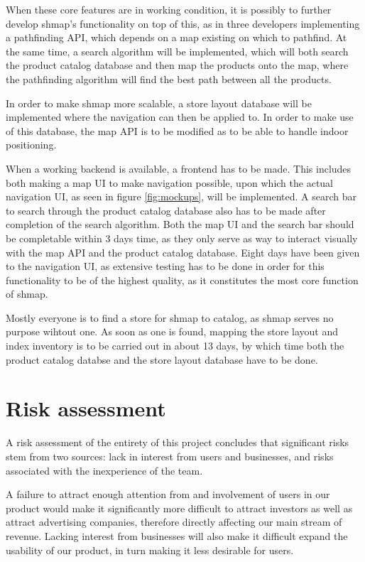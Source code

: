 \documentclass[titlepage]{article}
\begin{document}
When these core features are in working condition, it is possibly to further develop shmap's functionality on top of this, as in three developers implementing a pathfinding API, which depends on a map existing on which to pathfind. At the same time, a search algorithm will be implemented, which will both search the product catalog database and then map the products onto the map, where the pathfinding algorithm will find the best path between all the products.

In order to make shmap more scalable, a store layout database will be implemented where the navigation can then be applied to. In order to make use of this database, the map API is to be modified as to be able to handle indoor positioning.

When a working backend is available, a frontend has to be made. This includes both making a map UI to make navigation possible, upon which the actual navigation UI, as seen in figure \ref{fig:mockups}, will be implemented. A search bar to search through the product catalog database also has to be made after completion of the search algorithm. Both the map UI and the search bar should be completable within 3 days time, as they only serve as way to interact visually with the map API and the product catalog database. Eight days have been given to the navigation UI, as extensive testing has to be done in order for this functionality to be of the highest quality, as it constitutes the most core function of shmap.

Mostly everyone is to find a store for shmap to catalog, as shmap serves no purpose wihtout one. As soon as one is found, mapping the store layout and index inventory is to be carried out in about 13 days, by which time both the product catalog databse and the store layout database have to be done.

\section{Risk assessment}

A risk assessment of the entirety of this project concludes that significant risks stem from two sources: lack in interest from users and businesses, and risks associated with the inexperience of the team.

A failure to attract enough attention from and involvement of users in our product would make it significantly more difficult to attract investors as well as attract advertising companies, therefore directly affecting our main stream of revenue. Lacking interest from businesses will also make it difficult expand the usability of our product, in turn making it less desirable for users.
\end{document}
